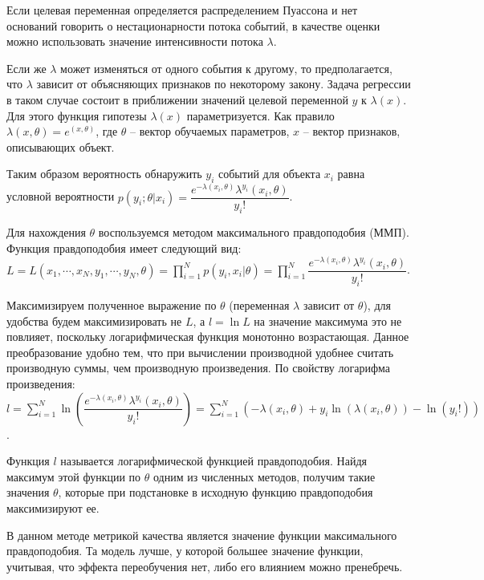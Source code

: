 Если целевая переменная определяется распределением Пуассона и нет оснований говорить о нестационарности потока событий, в качестве оценки можно использовать значение интенсивности потока $\lambda$.

Если же $\lambda$ может изменяться от одного события к другому, то предполагается, что $\lambda$ зависит от объясняющих признаков по некоторому закону. Задача регрессии в таком случае состоит в приближении значений целевой переменной $y$ к $\lambda(x)$. Для этого функция гипотезы $\lambda(x)$ параметризуется. Как правило \cite{Ignatov:functional_dependence} $\lambda(x, \theta) = e^{(x, \theta)}$, где $\theta$ -- вектор обучаемых параметров, $x$ -- вектор признаков, описывающих объект.

Таким образом вероятность обнаружить $y_i$ событий для объекта $x_i$ равна условной вероятности $p(y_i ; \theta | x_i) = \dfrac{e^{-\lambda(x_i, \theta)} \lambda^{y_i}(x_i, \theta)}{y_i!}$.

Для нахождения $\theta$ воспользуемся методом максимального правдоподобия (ММП). Функция правдоподобия имеет следующий вид:\newline $L = L(x_1, \cdots, x_N, y_1, \cdots, y_N, \theta) = \prod\limits_{i=1}^{N} p(y_i, x_i | \theta) = \prod\limits_{i=1}^{N} \dfrac{e^{-\lambda(x_i, \theta)} \lambda^{y_i}(x_i, \theta)}{y_i!}$.

Максимизируем полученное выражение по $\theta$ (переменная $\lambda$ зависит от $\theta$), для удобства будем максимизировать не $L$, а $l = \ln L$ на значение максимума это не повлияет, поскольку логарифмическая функция монотонно возрастающая. Данное преобразование удобно тем, что при вычислении производной удобнее считать производную суммы, чем производную произведения. По свойству логарифма произведения: \newline $l = \sum\limits_{i=1}^{N} \ln \left( \dfrac{e^{-\lambda(x_i, \theta)} \lambda^{y_i}(x_i, \theta)}{y_i!} \right) = \sum\limits_{i=1}^{N} \left( -\lambda(x_i, \theta) + y_i \ln(\lambda(x_i, \theta)) - \ln(y_i!) \right)$.

Функция $l$ называется логарифмической функцией правдоподобия. Найдя максимум этой функции по $\theta$ одним из численных методов, получим такие значения $\theta$, которые при подстановке в исходную функцию правдоподобия максимизируют ее.

В данном методе метрикой качества является значение функции максимального правдоподобия. Та модель лучше, у которой большее значение функции, учитывая, что эффекта переобучения нет, либо его влиянием можно пренебречь.

